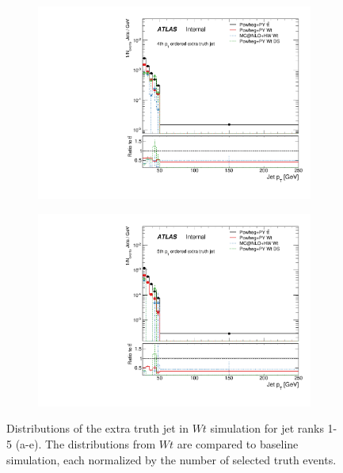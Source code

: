 \begin{figure}
\begin{subfigure}[]{0.33\textwidth}
\end{subfigure}
\begin{subfigure}[]{0.33\textwidth}
\includegraphics[width=\textwidth]{fig/MCComp/WtTruthPtJet3.pdf}
\end{subfigure}
\begin{subfigure}[]{0.33\textwidth}
\includegraphics[width=\textwidth]{fig/MCComp/WtTruthPtJet4.pdf}
\end{subfigure}
\caption{Distributions of the extra truth jet \pt in $Wt$ simulation for jet ranks 1-5 (a-e). The distributions from $Wt$ are compared to \ttbar baseline simulation, each normalized by the number of selected truth events.}
\label{fig:wttruthjetpt}
\end{figure}

\clearpage
